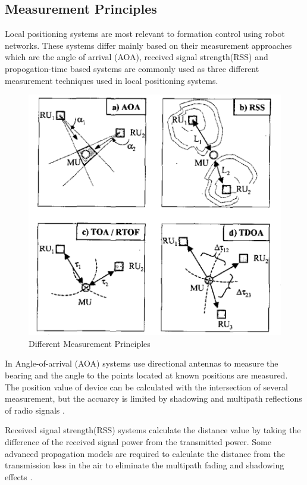 \subsection{Measurement Principles} \label{sssec:num1}
Local positioning systems are most relevant to formation control using robot networks. These systems differ mainly based on their measurement approaches which are the angle of arrival (AOA), received signal strength(RSS) and propogation-time based systems are commonly used as three different measurement techniques used in local positioning systems. 

\begin{figure}[H]
	\caption{Different Measurement Principles \cite{20}}
	\centering
	\includegraphics[scale = 0.4]{measurement}
\end{figure} 

In Angle-of-arrival (AOA) systems use directional antennas to measure the bearing and the angle to the points located at known positions are measured. The position value of device can be calculated with the intersection of several measurement, but the accuarcy is limited by shadowing and multipath reflections of radio signals \cite{20}. 

Received signal strength(RSS) systems calculate the distance value by taking the difference of the received signal power from the transmitted power. Some advanced propagation models are required to calculate the distance from the transmission loss in the air to eliminate the multipath fading and shadowing effects \cite{21}. 


